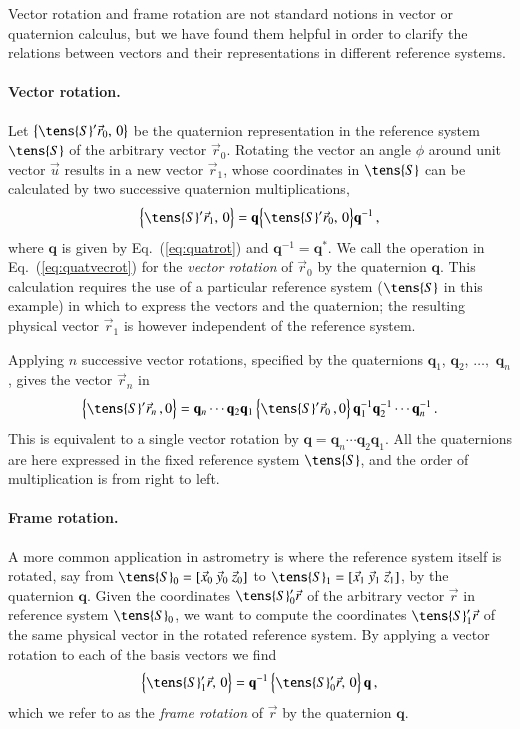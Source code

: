 \documentclass[structabstract]{aa}
\newcommand{\quat}[1]{\mathbf{#1}}
\begin{document}
Vector rotation and frame rotation are not standard notions in
vector or quaternion calculus, but we have found them helpful 
in order to clarify the relations between vectors and their 
representations in different reference systems.

\paragraph{Vector rotation.}
Let $\bigl\{\tens{S}'\vec{r}_0,\,0\bigr\}$ be the quaternion
representation in the reference system $\tens{S}$ of the arbitrary 
vector $\vec{r}_0$. Rotating the vector an angle $\phi$ around 
unit vector $\vec{u}$ results in a new vector $\vec{r}_1$, whose
coordinates in $\tens{S}$ can be calculated by two successive 
quaternion multiplications,
\begin{equation}\label{eq:quatvecrot}
\Bigl\{\tens{S}'\vec{r}_1,\,0\Bigr\}
=\quat{q}\Bigl\{\tens{S}'\vec{r}_0,\,0\Bigr\}\quat{q}^{-1} \, ,
\end{equation}
where $\quat{q}$ is given by Eq.~(\ref{eq:quatrot}) and $\quat{q}^{-1}=\quat{q}^*$.
We call the operation in Eq.~(\ref{eq:quatvecrot}) for the \emph{vector rotation} 
of $\vec{r}_0$ by the quaternion $\quat{q}$. This calculation requires the use 
of a particular reference system ($\tens{S}$ in this example) in which to
express the vectors and the quaternion; the resulting physical vector 
$\vec{r}_1$ is however independent of the reference system. 

Applying $n$ successive vector rotations, specified by the quaternions
$\quat{q}_1$, $\quat{q}_2$, $\dots,$ $\quat{q}_n$, gives the vector
$\vec{r}_n$ in
\begin{equation}\label{eq:quatvecrotn}
\Bigl\{\tens{S}'\vec{r}_n\,,0\Bigr\}
=\quat{q}_n\cdots\quat{q}_2\quat{q}_1
\,\Bigl\{\tens{S}'\vec{r}_0\,,0\Bigr\}\,
\quat{q}_1^{-1}\quat{q}_2^{-1}\cdots\quat{q}_n^{-1} \, .
\end{equation}
This is equivalent to a single vector rotation by 
$\quat{q}=\quat{q}_n\cdots\quat{q}_2\quat{q}_1$. All the
quaternions are here expressed in the fixed reference system
$\tens{S}$, and the order of multiplication is from right to left.

\paragraph{Frame rotation.}
A more common application in astrometry is where the reference
system itself is rotated, say from 
$\tens{S}_0=[\vec{x}_0~\vec{y}_0~\vec{z}_0]$ to
$\tens{S}_1=[\vec{x}_1~\vec{y}_1~\vec{z}_1]$, by the 
quaternion $\quat{q}$. Given the coordinates $\tens{S}_0'\vec{r}$
of the arbitrary vector $\vec{r}$ in reference system $\tens{S}_0$, we want
to compute the coordinates $\tens{S}_1'\vec{r}$ of the same physical
vector in the rotated reference system. By applying a vector rotation to 
each of the basis vectors we find
\begin{equation}\label{eq:quatframerot}
\Bigl\{\tens{S}_1'\vec{r},\,0\Bigr\}
=\quat{q}^{-1}\,\Bigl\{\tens{S}_0'\vec{r},\,0\Bigr\}\,\quat{q} \, ,
\end{equation}
which we refer to as the \emph{frame rotation} of $\vec{r}$ by the
quaternion $\quat{q}$. 
\end{document}
